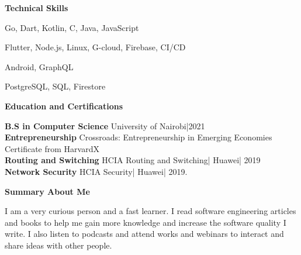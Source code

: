 \documentclass[a4paper]{article}
\begin{document}
\begin{center}
    {\Large \textbf{Technical Skills}}
\end{center}

\begin{description}[noitemsep]
    \item[Languages:] Go, Dart, Kotlin, C, Java, JavaScript
    \item[Platforms and tools:] Flutter, Node.js, Linux, G-cloud, Firebase, CI/CD
    \item[Frameworks:] Android, GraphQL
    \item[Databases:] PostgreSQL, SQL, Firestore
\end{description}

\begin{center}
    {\Large \textbf{Education and Certifications}}
\end{center}

\textbf{B.S in Computer Science} University of Nairobi|2021 \\
\textbf{Entrepreneurship} Crossroads: Entrepreneurship in Emerging Economies Certificate from HarvardX \\
\textbf{Routing and Switching} HCIA Routing and Switching| Huawei| 2019 \\
\textbf{Network Security} HCIA Security| Huawei| 2019. \par

\begin{center}
    {\Large \textbf{Summary About Me} }
\end{center}

I am a very curious person and a fast learner. I read software engineering articles and books to help me gain more knowledge and increase the software quality I write. I also listen to podcasts and attend works and webinars to interact and share ideas with other people.

\end{document}

